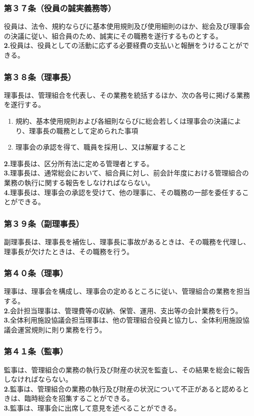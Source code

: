 \documentclass[12pt,uplatex]{jsarticle}
\begin{document}
\subsubsection*{第３７条（役員の誠実義務等）}
役員は、法令、規約ならびに基本使用規則及び使用細則のほか、総会及び理事会の決議に従い、組合員のため、誠実にその職務を遂行するものとする。\\
\textbf{2.}役員は、役員としての活動に応ずる必要経費の支払いと報酬をうけることができる。
\subsubsection*{第３８条（理事長）}
理事長は、管理組合を代表し、その業務を統括するほか、次の各号に掲げる業務を遂行する。
\begin{enumerate}
\item 規約、基本使用規則および各細則ならびに総会若しくは理事会の決議により、理事長の職務として定められた事項
\item 理事会の承認を得て、職員を採用し、又は解雇すること
\end{enumerate}
\textbf{2.}理事長は、区分所有法に定める管理者とする。\\
\textbf{3.}理事長は、通常総会において、組合員に対し、前会計年度における管理組合の業務の執行に関する報告をしなければならない。\\
\textbf{4.}理事長は、理事会の承認を受けて、他の理事に、その職務の一部を委任することができる。
\subsubsection*{第３９条（副理事長）}
副理事長は、理事長を補佐し、理事長に事故があるときは、その職務を代理し、理事長が欠けたときは、その職務を行う。
\subsubsection*{第４０条（理事）}
理事は、理事会を構成し、理事会の定めるところに従い、管理組合の業務を担当する。\\
\textbf{2.}会計担当理事は、管理費等の収納、保管、運用、支出等の会計業務を行う。\\
\textbf{3.}全体利用施設協議会担当理事は、他の管理組合役員と協力し、全体利用施設協議会運営規則に則り業務を行う。
\subsubsection*{第４１条（監事）}
監事は、管理組合の業務の執行及び財産の状況を監査し、その結果を総会に報告しなければならない。\\
\textbf{2.}監事は、管理組合の業務の執行及び財産の状況について不正があると認めるときは、臨時総会を招集することができる。\\
\textbf{3.}監事は、理事会に出席して意見を述べることができる。
\end{document}
